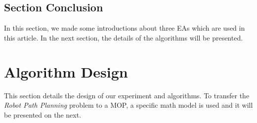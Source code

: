 \documentclass[a4paper, 11pt]{article}
\begin{document}
\subsection{Section Conclusion}
In this section, we made some introductions about three EAs which are used in this article. In the next section, the details of the algorithms will be presented.


\newpage

\section{Algorithm Design}
This section details the design of our experiment and algorithms. To transfer the \emph{Robot Path Planning} problem to a MOP, a specific math model is used and it will be presented on the next.\\
\end{document}
